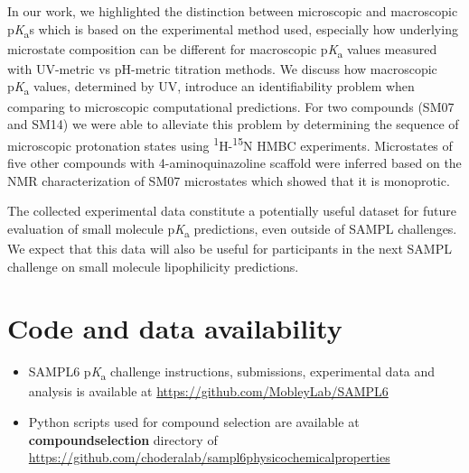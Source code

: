 \documentclass[9pt,lineno]{elife}
\newcommand{\pKa}{p\textit{K}\textsubscript{a}}
\begin{document}
In our work, we highlighted the distinction between microscopic and macroscopic \pKa{}s which is based on the experimental method used, especially how underlying microstate composition can be different for macroscopic \pKa{} values measured with UV-metric vs pH-metric titration methods. 
We discuss how macroscopic \pKa{} values, determined by UV, introduce an identifiability problem when comparing to microscopic computational predictions.
For two compounds (SM07 and SM14) we were able to alleviate this problem by determining the sequence of microscopic protonation states using \textsuperscript{1}H-\textsuperscript{15}N HMBC experiments.
Microstates of five other compounds with 4-aminoquinazoline scaffold were inferred based on the NMR characterization of SM07 microstates which showed that it is monoprotic. 

The collected experimental data constitute a potentially useful dataset for future evaluation of small molecule \pKa{} predictions, even outside of SAMPL challenges. We expect that this data will also be useful for participants in the next SAMPL challenge on small molecule lipophilicity predictions.


\section{Code and data availability}
\begin{minipage}{15cm}
\begin{itemize}

\item SAMPL6 \pKa{} challenge instructions, submissions, experimental data and analysis is available at  \href{https://github.com/MobleyLab/SAMPL6}{https://github.com/MobleyLab/SAMPL6}

\item Python scripts used for compound selection are available at \textbf{compound\textunderscore selection} directory of  
\href{https://github.com/choderalab/sampl6-physicochemical-properties}{https://github.com/choderalab/sampl6\textendash physicochemical\textendash properties}
\end{itemize}
\end{minipage}


\end{document}
